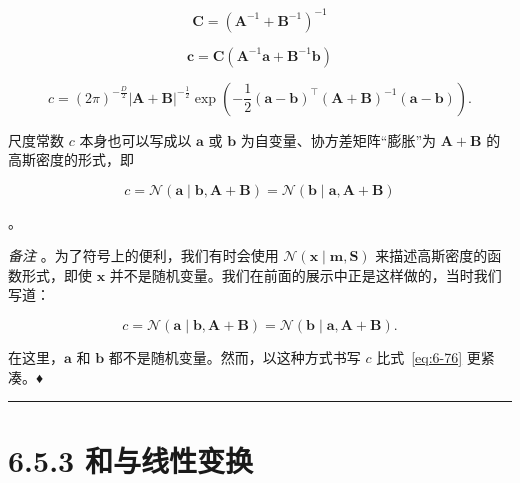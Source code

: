 \begin{equation}
\boldsymbol{C} = (\boldsymbol{A}^{-1} + \boldsymbol{B}^{-1})^{-1}
\tag{6.74}\label{eq:6-74}
\end{equation}

\begin{equation}
\boldsymbol{c} = \boldsymbol{C}(\boldsymbol{A}^{-1}\boldsymbol{a} + \boldsymbol{B}^{-1}\boldsymbol{b})
\tag{6.75}\label{eq:6-75}
\end{equation}

\begin{equation}
c = (2\pi)^{-\frac{D}{2}} |\boldsymbol{A} + \boldsymbol{B}|^{-\frac{1}{2}} \exp\left( -\frac{1}{2}(\boldsymbol{a} - \boldsymbol{b})^\top(\boldsymbol{A} + \boldsymbol{B})^{-1}(\boldsymbol{a} - \boldsymbol{b}) \right) .
\tag{6.76}\label{eq:6-76}
\end{equation}

尺度常数 $ c $ 本身也可以写成以 $ \boldsymbol{a} $ 或 $ \boldsymbol{b} $ 为自变量、协方差矩阵“膨胀”为 $ \boldsymbol{A} + \boldsymbol{B} $ 的高斯密度的形式，即

\begin{equation*}
c = \mathcal{N}(\boldsymbol{a} \mid \boldsymbol{b}, \boldsymbol{A} + \boldsymbol{B}) = \mathcal{N}(\boldsymbol{b} \mid \boldsymbol{a}, \boldsymbol{A} + \boldsymbol{B})
\end{equation*}

。

\emph{备注} 。为了符号上的便利，我们有时会使用 $ \mathcal{N}(\boldsymbol{x} \mid \boldsymbol{m}, \boldsymbol{S}) $ 来描述高斯密度的函数形式，即使 $ \boldsymbol{x} $ 并不是随机变量。我们在前面的展示中正是这样做的，当时我们写道：

\begin{equation}
c = \mathcal{N}(\boldsymbol{a} \mid \boldsymbol{b}, \boldsymbol{A} + \boldsymbol{B}) = \mathcal{N}(\boldsymbol{b} \mid \boldsymbol{a}, \boldsymbol{A} + \boldsymbol{B}) .
\tag{6.77}\label{eq:6-77}
\end{equation}

在这里，$ \boldsymbol{a} $ 和 $ \boldsymbol{b} $ 都不是随机变量。然而，以这种方式书写 $ c $ 比式~\eqref{eq:6-76} 更紧凑。♦

\medskip\hrule\medskip

\section*{6.5.3 和与线性变换}

